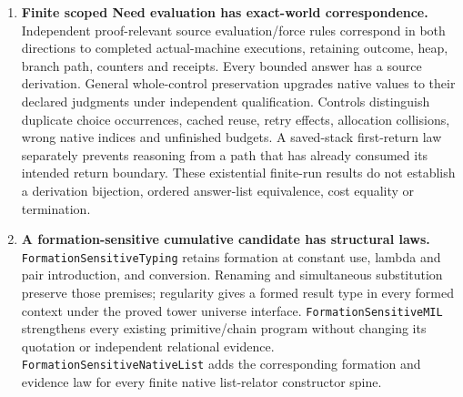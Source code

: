 \documentclass[11pt]{article}
\theoremstyle{definition}
\theoremstyle{remark}
\begin{document}
\begin{enumerate}
  derives the logical heap invariant from initial source typing and the
  independently qualified primitive implementation, throughout every actual
  successor and bounded frontier. Every returned native value is admitted
  in a formed ambient context. The primitive obligation is discharged for
  retention and dependent reflexivity over arbitrary admitted compositions;
  a changed-index implementation returns operationally but fails qualification.
  Independently, the generic allocation-slot invariant is preserved by
  every actual step, so fresh allocation succeeds from reachable empty-heap
  states without a caller-supplied success premise.
  Actual executions separate shared from independent choices,
  no-force allocation from eager work, stable from retryable failure, and
  unfinished fuel from a negative logical answer. Retry retains earlier
  effect receipts. These are scoped source execution and whole-control typing laws,
  not full CBPV qualification or a C implementation.
\item \textbf{Finite scoped Need evaluation has exact-world correspondence.}
  Independent proof-relevant source evaluation/force rules correspond in
  both directions to completed actual-machine executions, retaining outcome,
  heap, branch path, counters and receipts. Every bounded answer has a
  source derivation. General whole-control preservation upgrades native
  values to their declared judgments under independent qualification.
  Controls distinguish duplicate choice occurrences, cached reuse, retry
  effects, allocation collisions, wrong native indices and unfinished budgets.
  A saved-stack first-return law separately prevents reasoning from a path
  that has already consumed its intended return boundary.
  These existential finite-run results do not establish a derivation
  bijection, ordered answer-list equivalence, cost equality or termination.
\item \textbf{A formation-sensitive cumulative candidate has structural laws.}
  \nolinkurl{FormationSensitiveTyping} retains formation at constant use,
  lambda and pair introduction, and conversion. Renaming and simultaneous
  substitution preserve those premises; regularity gives a formed result
  type in every formed context under the proved tower universe interface.
  \nolinkurl{FormationSensitiveMIL} strengthens every existing primitive/chain
  program without changing its quotation or independent relational evidence.
  \nolinkurl{FormationSensitiveNativeList} adds the corresponding formation
  and evidence law for every finite native list-relator constructor spine.

\end{enumerate}
\end{document}
